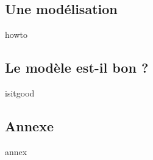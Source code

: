 \subsection{Une modélisation}

{howto}



\subsection{Le modèle est-il bon ?}

{isitgood}



\subsection{Annexe}

{annex}
